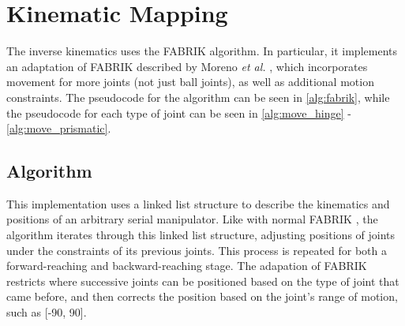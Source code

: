 \section{Kinematic Mapping}

The inverse kinematics uses the FABRIK algorithm. In particular, it implements an adaptation of FABRIK described by Moreno \textit{et al.} \cite{bib:ik_FABRIK_constraints}, which incorporates movement for more joints (not just ball joints), as well as additional motion constraints. The pseudocode for the algorithm can be seen in \autoref{alg:fabrik}, while the pseudocode for each type of joint can be seen in \autoref{alg:move_hinge} - \autoref{alg:move_prismatic}.

\subsection{Algorithm}
This implementation uses a linked list structure to describe the kinematics and positions of an arbitrary serial manipulator. Like with normal FABRIK \cite{bib:ik_original_FABRIK}, the algorithm iterates through this linked list structure, adjusting positions of joints under the constraints of its previous joints. This process is repeated for both a forward-reaching and backward-reaching stage. The adapation of FABRIK restricts where successive joints can be positioned based on the type of joint that came before, and then corrects the position based on the joint's range of motion, such as [-90\degree, 90\degree].

